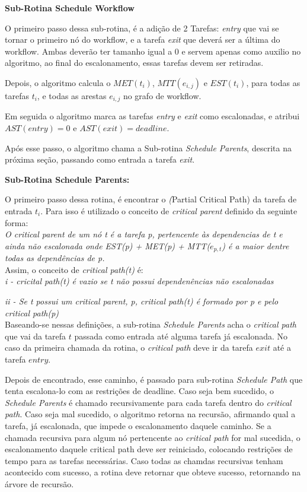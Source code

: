 \documentclass[a4paper,10pt]{article}
\begin{document}
\textbf{Sub-Rotina Schedule Workflow}

O primeiro passo dessa sub-rotina, é a adição de 2 Tarefas: \emph{entry} que vai se tornar o primeiro nó do workflow, e  a tarefa \emph{exit} que deverá ser a última do workflow. Ambas deverão ter tamanho igual a 0 e servem apenas como auxilio no algoritmo, ao final do escalonamento, essas tarefas devem ser retiradas.

Depois, o algoritmo calcula o $MET(t_{i})$, $MTT(e_{i,j})$ e $EST(t_{i})$, para todas as tarefas $t_{i}$, e todas as arestas $e_{i,j}$ no grafo de workflow.

Em seguida o algoritmo marca as tarefas \emph{entry} e \emph{exit} como escalonadas, e atribui $AST(entry)=0$ e $AST(exit)=deadline$.

Após esse passo, o algoritmo chama a Sub-rotina \emph{Schedule Parents}, descrita na próxima seção, passando como entrada a tarefa \emph{exit}.

\textbf{Sub-Rotina Schedule Parents:}

O primeiro passo dessa rotina, é encontrar o \emph(Partial Critical Path) da tarefa de entrada $t_{i}$. Para isso é utilizado o conceito de \emph{critical parent} definido da seguinte forma:\\

\emph{O critical parent de um nó t é a tarefa p, pertencente às dependencias de t e ainda não escalonada onde EST(p) + MET(p) + MTT($e_{p,t}$) é a maior dentre todas as dependências de p.}\\

Assim, o conceito de \emph{critical path(t)} é:\\

\emph{i  - cricital path(t) é vazio se t não possui dependenências não escalonadas}

\emph{ii - Se t possui um critical parent, p, critical path(t) é formado por p e pelo critical path(p)}\\

Baseando-se nessas definições, a sub-rotina \emph{Schedule Parents} acha o \emph{critical path} que vai da tarefa $t$ passada como entrada até alguma tarefa já escalonada. No caso da primeira chamada da rotina, o \emph{critical path} deve ir da tarefa $exit$ até a tarefa $entry$.

Depois de encontrado, esse caminho, é passado para sub-rotina \emph{Schedule Path} que tenta escalona-lo com as restrições de deadline. Caso seja bem sucedido, o \emph {Schedule Parents} é chamado recursivamente para cada tarefa dentro do \emph{critical path}. Caso seja mal sucedido, o algoritmo retorna na recursão, afirmando qual a tarefa, já escalonada, que impede o escalonamento daquele caminho. Se a chamada recursiva para algum nó pertencente ao \emph{critical path} for mal sucedida, o escalonamento daquele critical path deve ser reiniciado, colocando restrições de tempo para as tarefas necessárias. Caso todas as chamdas recursivas tenham acontecido com sucesso, a rotina deve retornar que obteve sucesso, retornando na árvore de recursão.
\end{document}
